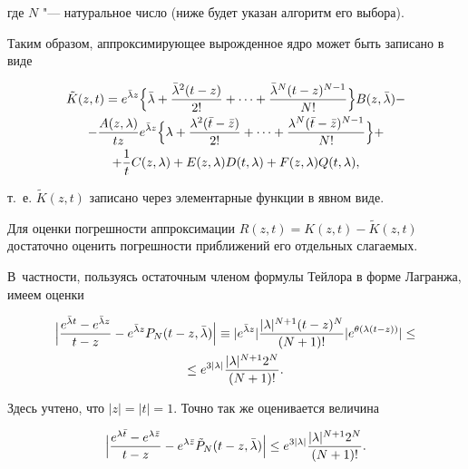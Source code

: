 где  $N$ "--- натуральное число (ниже будет указан алгоритм его выбора).



Таким образом, аппроксимирующее вырожденное ядро может быть записано в виде

\begin{multline}

\label{iman:eq9}

\tilde K(z,t) = e^{\bar \lambda z} \Bigl\{\bar \lambda  + \frac{\bar \lambda ^2 (t - z)}{2!} +  \dots  + \frac{\bar \lambda ^N (t - z)^{N - 1} }{N!}\Bigr\}   B(z,\bar \lambda ) - \\

- \frac{A(z,\lambda )}{tz}e^{\bar \lambda z} \Bigl\{ \lambda  + \frac{\lambda ^2 (\bar t - \bar z)}{2!} +  \dots  + \frac{\lambda ^N (\bar t - \bar z)^{N - 1} }{N!} \Bigr\} +\\

+ \frac{1}{t}C(z,\lambda ) + E(z,\lambda )   D(t,\lambda ) + F(z,\lambda )   Q(t,\lambda ),

\end{multline}

т.~е. $\tilde K(z,t)$ записано через элементарные функции в явном виде. 

Для оценки погрешности аппроксимации  $R(z,t) = K(z,t) - \tilde K(z,t)$ достаточно оценить погрешности приближений его отдельных слагаемых. 

В~частности, пользуясь остаточным членом формулы Тейлора в форме Лагранжа, имеем оценки

\begin{multline*}

\Bigl| \frac{e^{\bar \lambda t}  - e^{\bar \lambda z} }{t - z} - e^{\bar \lambda z} P_N (t - z,\bar \lambda ) \Bigr| \equiv | e^{\bar \lambda z}  |   \frac{|\lambda |^{N + 1} (t - z)^N }{(N + 1)!}   | e^{\theta (\lambda (t - z))} | \le \\

\le e^{3|\lambda |}    \frac{|\lambda |^{N + 1} 2^N }{(N + 1)!}.

\end{multline*}

Здесь учтено, что $|z| = |t| = 1$. Точно так же оценивается величина

\[

\Bigl| \frac{e^{\lambda \bar t}  - e^{\lambda \bar z} }{t - z} - e^{\lambda \bar z} \tilde P_N (t - z,\bar \lambda ) \Bigr| \le e^{3|\lambda |}    \frac{|\lambda |^{N + 1} 2^N }{(N + 1)!}.

\]



